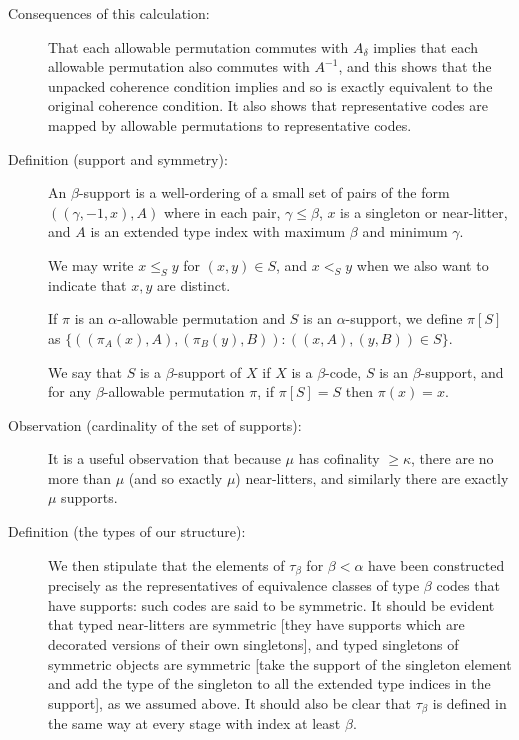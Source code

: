 \documentclass[112pt]{article}
\begin{document}
\begin{description}
\item[Consequences of this calculation:]

That each allowable permutation commutes with $A_\delta$ implies that each allowable permutation also commutes with $A^{-1}$, and this shows
that the unpacked coherence condition implies and so is exactly equivalent to the original coherence condition.  It also shows that representative codes
are mapped by allowable permutations to representative codes.



\item[Definition (support and symmetry):]  An $\beta$-support is a well-ordering of a small set of pairs of the form $((\gamma,-1,x),A)$
where in each pair, $\gamma\leq \beta$, $x$ is a singleton or near-litter, and $A$ is an extended type index with maximum $\beta$ and minimum $\gamma$.

We may write $x \leq_S y$ for $(x,y) \in S$, and $x <_S y$ when we also want to indicate that $x,y$ are distinct.

If $\pi$ is an $\alpha$-allowable permutation and $S$ is an $\alpha$-support, we define $\pi[S]$ as $\{((\pi_A(x),A),(\pi_B(y),B)):((x,A),(y,B))\in S\}$.

We say that $S$ is a $\beta$-support of $X$ if $X$ is a $\beta$-code, $S$ is an $\beta$-support, and for any $\beta$-allowable permutation $\pi$, if $\pi[S]=S$ then $\pi(x)=x$.

\item[Observation (cardinality of the set of supports):]  It is a useful observation that because $\mu$ has cofinality $\geq \kappa$, there are no more than $\mu$ (and so exactly $\mu$) near-litters,
and similarly there are exactly $\mu$ supports.

\item[Definition (the types of our structure):]  We then stipulate that the elements of $\tau_\beta$  for $\beta <\alpha$ have been constructed precisely as the representatives of equivalence classes of type $\beta$ codes that have supports:  such codes are said to be symmetric.  It should be evident that typed near-litters are symmetric [they have supports which are decorated versions of their own singletons], and typed singletons of symmetric objects are symmetric [take the support of the singleton element and add the type of the singleton to all the extended type indices in the support], as we assumed above.   It should also be clear that $\tau_\beta$ is defined in the same way at every stage with index at least $\beta$.


\end{description}
\end{document}
